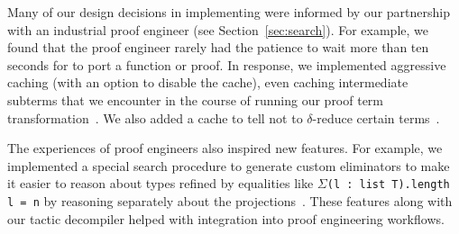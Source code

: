 Many of our design decisions in implementing \toolname were informed by our partnership with
an industrial proof engineer (see Section~\ref{sec:search}).
For example, we found that the proof engineer rarely had the patience to wait more than ten seconds
for \toolname to port a function or proof.
In response, we implemented aggressive caching (with an option to disable the cache), even caching intermediate subterms that
we encounter in the course of running our proof term transformation~.
We also added a cache to tell \toolname not to $\delta$-reduce certain terms~. %

The experiences of proof engineers also inspired new features.
For example, we implemented a special search procedure to generate custom eliminators %
to make it easier to reason about types refined by equalities like $\Sigma$\lstinline{(l : list T).length l = n}
by reasoning separately about the projections~. %
These features along with our tactic decompiler helped with integration into proof engineering workflows.

